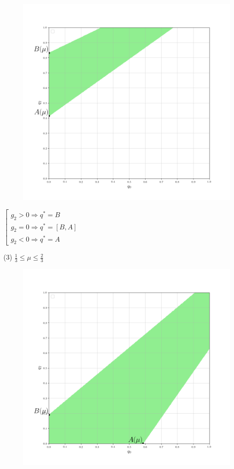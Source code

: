 \begin{flushleft}
		
	\begin{figure}[H]
		\centering
  		\includegraphics[scale=0.4]{images/graf_3_7}
  		\caption{}
	\end{figure}
	
	\begin{center}
		$\left[
		\begin{gathered}
			g_2 > 0 \Rightarrow q^*=B \\
			g_2 = 0 \Rightarrow q^*=[B,A] \\
			g_2 < 0 \Rightarrow q^*=A
		\end{gathered}
		\right.$	
	\end{center}	

	(3) $\frac{1}{3} \leqslant \mu \leqslant \frac{2}{3}$
	
		
	\begin{figure}[H]
		\centering
  		\includegraphics[scale=0.4]{images/graf_3_8}
  		\caption{}
	\end{figure}
	

\end{flushleft}
